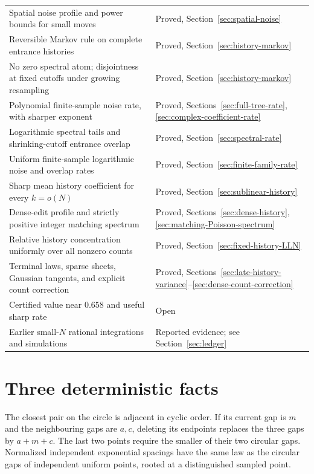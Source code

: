 \documentclass[11pt,letterpaper]{article}
\begin{document}
\begin{center}
\begin{tabular}{p{}p{}}
Spatial noise profile and power bounds for small moves & Proved, Section~\ref{sec:spatial-noise}\\
Reversible Markov rule on complete entrance histories & Proved, Section~\ref{sec:history-markov}\\
No zero spectral atom; disjointness at fixed cutoffs under growing resampling & Proved, Section~\ref{sec:history-markov}\\
Polynomial finite-sample noise rate, with sharper exponent & Proved, Sections~\ref{sec:full-tree-rate}, \ref{sec:complex-coefficient-rate}\\
Logarithmic spectral tails and shrinking-cutoff entrance overlap & Proved, Section~\ref{sec:spectral-rate}\\
Uniform finite-sample logarithmic noise and overlap rates & Proved, Section~\ref{sec:finite-family-rate}\\
Sharp mean history coefficient for every $k=o(N)$ & Proved, Section~\ref{sec:sublinear-history}\\
Dense-edit profile and strictly positive integer matching spectrum & Proved, Sections~\ref{sec:dense-history}, \ref{sec:matching-Poisson-spectrum}\\
Relative history concentration uniformly over all nonzero counts & Proved, Section~\ref{sec:fixed-history-LLN}\\
Terminal laws, sparse sheets, Gaussian tangents, and explicit count correction & Proved, Sections~\ref{sec:late-history-variance}--\ref{sec:dense-count-correction}\\
Certified value near $0.658$ and useful sharp rate & Open\\
Earlier small-$N$ rational integrations and simulations & Reported evidence; see Section~\ref{sec:ledger}\\
\bottomrule
\end{tabular}
\end{center}

\section{Three deterministic facts}\label{sec:deterministic}

The closest pair on the circle is adjacent in cyclic order. If its current
gap is $m$ and the neighbouring gaps are $a,c$, deleting its endpoints
replaces the three gaps by $a+m+c$. The last two points require the smaller
of their two circular gaps. Normalized independent exponential spacings
have the same law as the circular gaps of independent uniform points,
rooted at a distinguished sampled point.
\end{document}
